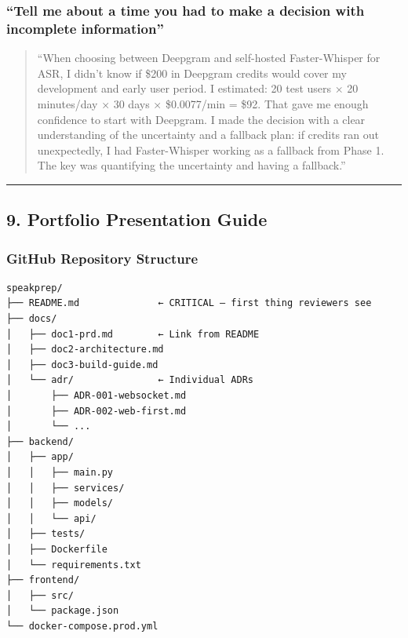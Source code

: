 \documentclass[
  11pt,
]{article}
\begin{document}
\hypertarget{tell-me-about-a-time-you-had-to-make-a-decision-with-incomplete-information}{%
\subsubsection{``Tell me about a time you had to make a decision with
incomplete
information''}\label{tell-me-about-a-time-you-had-to-make-a-decision-with-incomplete-information}}

\begin{quote}
``When choosing between Deepgram and self-hosted Faster-Whisper for ASR,
I didn't know if \$200 in Deepgram credits would cover my development
and early user period. I estimated: 20 test users × 20 minutes/day × 30
days × \$0.0077/min = \$92. That gave me enough confidence to start with
Deepgram. I made the decision with a clear understanding of the
uncertainty and a fallback plan: if credits ran out unexpectedly, I had
Faster-Whisper working as a fallback from Phase 1. The key was
quantifying the uncertainty and having a fallback.''
\end{quote}

\begin{center}\rule{0.5\linewidth}{0.5pt}\end{center}

\hypertarget{portfolio-presentation-guide}{%
\subsection{9. Portfolio Presentation
Guide}\label{portfolio-presentation-guide}}

\hypertarget{github-repository-structure}{%
\subsubsection{GitHub Repository
Structure}\label{github-repository-structure}}

\begin{lstlisting}
speakprep/
├── README.md              ← CRITICAL — first thing reviewers see
├── docs/
│   ├── doc1-prd.md        ← Link from README
│   ├── doc2-architecture.md
│   ├── doc3-build-guide.md
│   └── adr/               ← Individual ADRs
│       ├── ADR-001-websocket.md
│       ├── ADR-002-web-first.md
│       └── ...
├── backend/
│   ├── app/
│   │   ├── main.py
│   │   ├── services/
│   │   ├── models/
│   │   └── api/
│   ├── tests/
│   ├── Dockerfile
│   └── requirements.txt
├── frontend/
│   ├── src/
│   └── package.json
└── docker-compose.prod.yml
\end{lstlisting}
\end{document}
